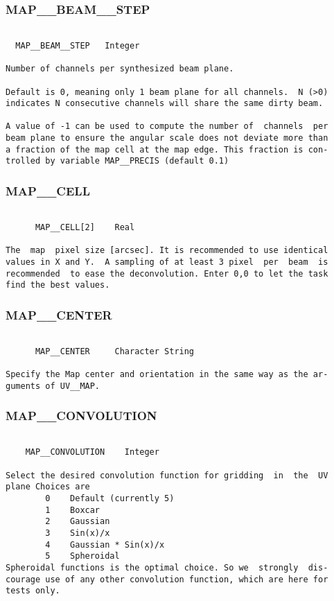 \subsubsection{MAP\_\_BEAM\_\_STEP}
\begin{verbatim}

  MAP__BEAM__STEP   Integer

Number of channels per synthesized beam plane.

Default is 0, meaning only 1 beam plane for all channels.  N (>0)
indicates N consecutive channels will share the same dirty beam.

A value of -1 can be used to compute the number of  channels  per
beam plane to ensure the angular scale does not deviate more than
a fraction of the map cell at the map edge. This fraction is con-
trolled by variable MAP__PRECIS (default 0.1)

\end{verbatim}
\subsubsection{MAP\_\_CELL}
\begin{verbatim}

      MAP__CELL[2]    Real

The  map  pixel size [arcsec]. It is recommended to use identical
values in X and Y.  A sampling of at least 3 pixel  per  beam  is
recommended  to ease the deconvolution. Enter 0,0 to let the task
find the best values.

\end{verbatim}
\subsubsection{MAP\_\_CENTER}
\begin{verbatim}

      MAP__CENTER     Character String

Specify the Map center and orientation in the same way as the ar-
guments of UV__MAP.

\end{verbatim}
\subsubsection{MAP\_\_CONVOLUTION}
\begin{verbatim}

    MAP__CONVOLUTION    Integer

Select the desired convolution function for gridding  in  the  UV
plane Choices are
        0    Default (currently 5)
        1    Boxcar
        2    Gaussian
        3    Sin(x)/x
        4    Gaussian * Sin(x)/x
        5    Spheroidal
Spheroidal functions is the optimal choice. So we  strongly  dis-
courage use of any other convolution function, which are here for
tests only.

\end{verbatim}
